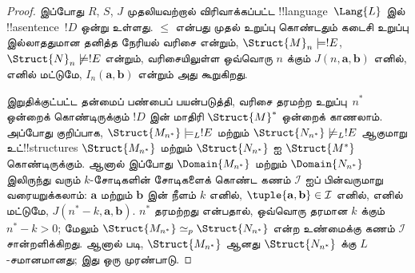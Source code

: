\documentclass[../../../include/open-logic-section]{subfiles}
\begin{document}
\begin{proof}
இப்போது $R$, $S$, $J$ முதலியவற்றால் விரிவாக்கப்பட்ட
!!{language}~$\Lang{L}$ இல் !!a{sentence}~$!D$ ஒன்று உள்ளது.
$\le$ என்பது முதல் உறுப்பு கொண்டதும் கடைசி உறுப்பு
இல்லாததுமான தனித்த நேரியல் வரிசை என்றும், $\Struct{M}_n \models
!E$, $\Struct{N}_n \not\models !E$ என்றும், வரிசையிலுள்ள ஒவ்வொரு
$n$ க்கும் $J(n, \mathbf{a}, \mathbf{b})$ எனில், எனில் மட்டுமே,
$I_n(\mathbf{a}, \mathbf{b})$ என்றும் அது கூறுகிறது.

இறுதிக்குட்பட்ட தன்மைப் பண்பைப் பயன்படுத்தி, வரிசை தரமற்ற
உறுப்பு~$n^*$ ஒன்றைக் கொண்டிருக்கும் $!D$ இன் மாதிரி
$\Struct{M}^*$ ஒன்றைக் காணலாம். அப்போது குறிப்பாக,
$\Struct{M_{n^*}} \models_L !E$ மற்றும் $\Struct{N_{n^*}}
\not\models_L !E$ ஆகுமாறு உட்!!{structure}s
$\Struct{M_{n^*}}$ மற்றும் $\Struct{N_{n^*}}$ ஐ
$\Struct{M^*}$ கொண்டிருக்கும். ஆனால் இப்போது
$\Domain{M_{n^*}}$ மற்றும் $\Domain{N_{n^*}}$ இலிருந்து வரும்
$k$-சோடிகளின் சோடிகளைக் கொண்ட கணம் $\mathcal{I}$ ஐப்
பின்வருமாறு வரையறுக்கலாம்: $\mathbf{a}$ மற்றும் $\mathbf{b}$ இன்
நீளம் $k$ எனில், $\tuple{\mathbf{a}, \mathbf{b}} \in \mathcal{I}$
எனில், எனில் மட்டுமே, $J(n^*-k, \mathbf{a}, \mathbf{b})$.
$n^*$ தரமற்றது என்பதால், ஒவ்வொரு தரமான $k$ க்கும்
$n^* - k >0$; மேலும் $\Struct{M_{n^*}} \simeq_p
\Struct{N_{n^*}}$ என்ற உண்மைக்கு கணம் $\mathcal{I}$ சான்றளிக்கிறது.
ஆனால்  படி,
$\Struct{M_{n^*}}$ ஆனது $\Struct{N_{n^*}}$ க்கு $L$-சமானமானது;
இது ஒரு முரண்பாடு.
\end{proof}
\end{document}
